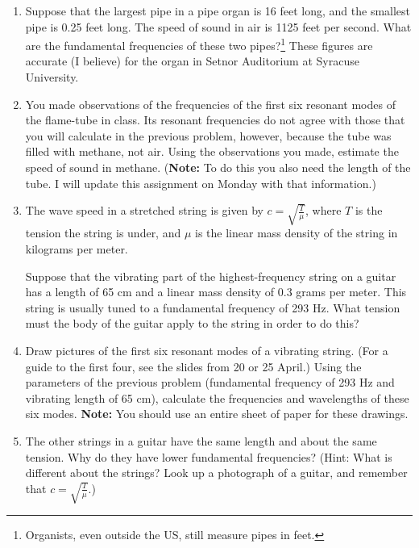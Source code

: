 \documentclass[12pt]{article}
\begin{document}
\Large
\centerline{}
\normalsize
\centerline{}


\begin{enumerate}

\item Suppose that the largest pipe in a pipe organ is 16 feet long, and the smallest pipe is 0.25 feet long. The speed of sound in air is 1125 feet per second. What 
are the fundamental frequencies of these two pipes?\footnote{Organists, even outside the US, still measure pipes in feet.} These figures are accurate (I believe) for the
organ in Setnor Auditorium at Syracuse University.

\item You made observations of the frequencies of the first six resonant modes of the flame-tube in class. Its resonant frequencies do not agree with those that you will
calculate in the previous problem, however, because the tube was filled with methane, not air. Using the observations you made, estimate the speed of sound in methane.
({\bf Note:} To do this you also need the length of the tube. I will update this assignment on Monday with that information.)

\item The wave speed in a stretched string is given by $c=\sqrt{\frac{T}{\mu}}$, where $T$ is the tension the string is under, and $\mu$ is the linear mass 
density of the string in kilograms per meter. 

Suppose that the vibrating part of the highest-frequency string on a guitar has a length of 65 cm and a linear mass density of 0.3 grams per meter. This string
is usually tuned to a fundamental frequency of 293 Hz. What tension must the body of the guitar apply to the string in order to do this?

\item Draw pictures of the first six resonant modes of a vibrating string. (For a guide to the first four, see the slides from 20 or 25 April.) Using the parameters
of the previous problem (fundamental frequency of 293 Hz and vibrating length of 65 cm), calculate the frequencies and wavelengths of these six modes. {\bf Note: 
} You should use an entire sheet of paper for these drawings.

\item The other strings in a guitar have the same length and about the same tension. Why do they have lower fundamental frequencies? (Hint: What is different 
about the strings? Look up a photograph of a guitar, and remember that $c=\sqrt{\frac{T}{\mu}}$.) 


\end{enumerate}
\end{document}
